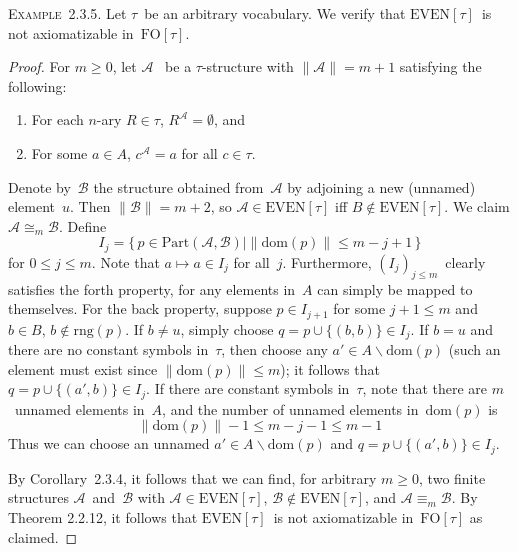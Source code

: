 \documentclass[letterpaper]{article}
\newcommand{\A}{\mathcal{A}}
\newcommand{\B}{\mathcal{B}}
\newcommand{\dom}{\mathrm{dom}}
\newcommand{\rng}{\mathrm{rng}}
\newcommand{\pisos}{\mathrm{Part}}
\newcommand{\fo}{\mathrm{FO}}
\newcommand{\even}{\mathrm{EVEN}}
\newcommand{\iso}{\cong}
\newcommand{\union}{\cup}
\newcommand{\diff}{\mathrel{\backslash}}
\newcommand{\card}[1]{\|{#1}\|}
\newcommand{\example}[1]{\noindent\textsc{Example~{#1}.}}
\theoremstyle{plain}
\begin{document}
\example{2.3.5}
Let $\tau$~be an arbitrary vocabulary. We verify that $\even[\tau]$~is not axiomatizable in~$\fo[\tau]$.
\begin{proof}
For $m\ge0$, let $\A$~ be a $\tau$-structure with $\card{\A}=m+1$ satisfying the following:
\begin{enumerate}[itemsep=0pt]
\item For each $n$-ary $R\in\tau$, $R^{\A}=\emptyset$, and
\item For some $a\in A$, $c^{\A}=a$ for all $c\in\tau$.
\end{enumerate}
Denote by~$\B$ the structure obtained from~$\A$ by adjoining a new (unnamed) element~$u$. Then $\card{\B}=m+2$, so $\A\in\even[\tau]$ iff $B\not\in\even[\tau]$. We claim $\A\iso_m\B$. Define
$$I_j=\{\,p\in\pisos(\A,\B)\mid\card{\dom(p)}\le m-j+1\,\}$$
for $0\le j\le m$. Note that $a\mapsto a\in I_j$ for all~$j$. Furthermore, $(I_j)_{j\le m}$~clearly satisfies the forth property, for any elements in~$A$ can simply be mapped to themselves. For the back property, suppose $p\in I_{j+1}$ for some $j+1\le m$ and $b\in B$, $b\not\in\rng(p)$. If $b\ne u$, simply choose $q=p\union\{(b,b)\}\in I_j$. If $b=u$ and there are no constant symbols in~$\tau$, then choose any $a'\in A\diff\dom(p)$ (such an element must exist since $\card{\dom(p)}\le m$); it follows that $q=p\union\{(a',b)\}\in I_j$. If there are constant symbols in~$\tau$, note that there are $m$~unnamed elements in~$A$, and the number of unnamed elements in~$\dom(p)$ is
$$\card{\dom(p)}-1\le m-j-1\le m-1$$
Thus we can choose an unnamed $a'\in A\diff\dom(p)$ and $q=p\union\{(a',b)\}\in I_j$.

By Corollary~2.3.4, it follows that we can find, for arbitrary $m\ge0$, two finite structures $\A$~and~$\B$ with $\A\in\even[\tau]$, $\B\not\in\even[\tau]$, and $\A\equiv_m\B$. By Theorem 2.2.12, it follows that $\even[\tau]$~is not axiomatizable in~$\fo[\tau]$ as claimed.
\end{proof}
\end{document}
